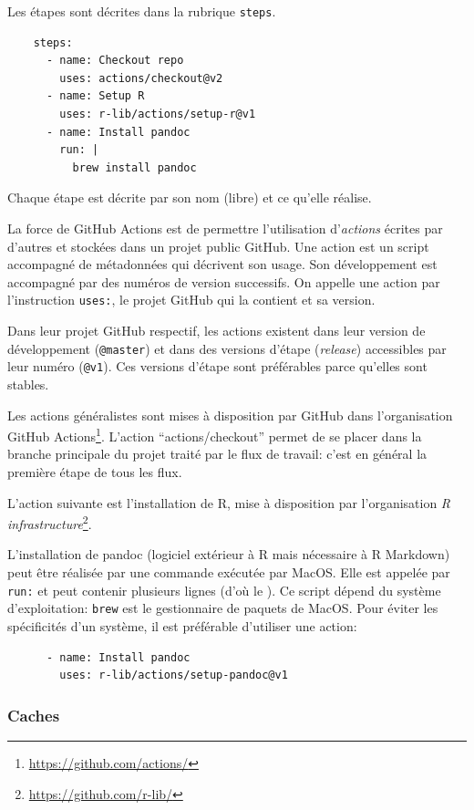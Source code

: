\documentclass[
  12pt,
  french,
  a4paper,
  extrafontsizes,onecolumn,openright
  ]{memoir}
\begin{document}
Les étapes sont décrites dans la rubrique \texttt{steps}.

\begin{verbatim}
    steps:
      - name: Checkout repo
        uses: actions/checkout@v2
      - name: Setup R
        uses: r-lib/actions/setup-r@v1
      - name: Install pandoc
        run: |
          brew install pandoc
\end{verbatim}

Chaque étape est décrite par son nom (libre) et ce qu'elle réalise.

La force de GitHub Actions est de permettre l'utilisation d'\emph{actions} écrites par d'autres et stockées dans un projet public GitHub.
Une action est un script accompagné de métadonnées qui décrivent son usage.
Son développement est accompagné par des numéros de version successifs.
On appelle une action par l'instruction \texttt{uses:}, le projet GitHub qui la contient et sa version.

Dans leur projet GitHub respectif, les actions existent dans leur version de développement (\texttt{@master}) et dans des versions d'étape (\emph{release}) accessibles par leur numéro (\texttt{@v1}).
Ces versions d'étape sont préférables parce qu'elles sont stables.

Les actions généralistes sont mises à disposition par GitHub dans l'organisation GitHub Actions\footnote{\url{https://github.com/actions/}}.
L'action \enquote{actions/checkout} permet de se placer dans la branche principale du projet traité par le flux de travail: c'est en général la première étape de tous les flux.

L'action suivante est l'installation de R, mise à disposition par l'organisation \emph{R infrastructure}\footnote{\url{https://github.com/r-lib/}}.

L'installation de pandoc (logiciel extérieur à R mais nécessaire à R Markdown) peut être réalisée par une commande exécutée par MacOS.
Elle est appelée par \texttt{run:} et peut contenir plusieurs lignes (d'où le \texttt{\textbar{}}).
Ce script dépend du système d'exploitation: \texttt{brew} est le gestionnaire de paquets de MacOS.
Pour éviter les spécificités d'un système, il est préférable d'utiliser une action:

\begin{verbatim}
      - name: Install pandoc
        uses: r-lib/actions/setup-pandoc@v1
\end{verbatim}

\hypertarget{caches}{%
\subsubsection{Caches}\label{caches}}
\end{document}
